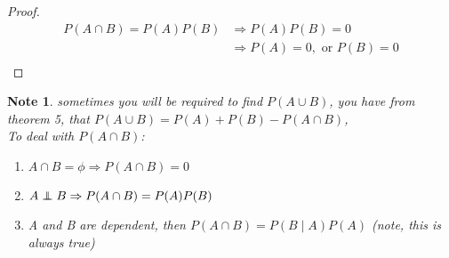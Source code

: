 \documentclass[11pt]{article}
\newtheorem*{note}{Note}
\newcommand\independent{\protect\mathpalette{\protect\independenT}{\perp}}
\def\independenT#1#2{\mathrel{\rlap{$#1#2$}\mkern2mu{#1#2}}}
\begin{document}
\begin{enumerate}
\begin{proof}
\begin{align*}
                                P(A \cap B) = P(A) P(B) &\Rightarrow P(A) P(B) = 0 \\
                                                        &\Rightarrow P(A) = 0, \text{ or } P(B) = 0\\
                            \end{align*}
                        \end{proof}
                        \begin{note}
                            sometimes you will be required to find $P(A \cup B)$, you have from theorem 5, that 
                            $P(A \cup B) = P(A) + P(B) - P(A \cap B)$, \\
                            To deal with $P(A \cap B)$:
                            \begin{enumerate}
                                \item $A \cap B = \phi \Rightarrow P(A \cap B) = 0$
                                \item $A \independent B \Rightarrow P(A \cap B) = P(A)P(B)$
                                \item A and B are dependent, then $P(A \cap B) = P(B \mid A) P(A) $ (note, this is always true)
                            \end{enumerate}
                        \end{note}
            \end{enumerate}
\end{document}
